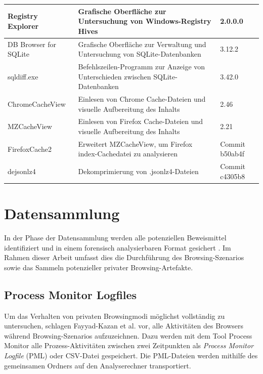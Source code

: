 \begin{table}[h!]
{\begin{tabular}{|l|l|l|}
Registry Explorer                       & Grafische Oberfläche zur Untersuchung von Windows-Registry Hives                & 2.0.0.0                               \\ \hline
DB Browser for SQLite                   & Grafische Oberfläche zur Verwaltung und Untersuchung von SQLite-Datenbanken      & 3.12.2                                \\ \hline
sqldiff.exe                             & Befehlszeilen-Programm zur Anzeige von Unterschieden zwischen SQLite-Datenbanken & 3.42.0                                \\ \hline
ChromeCacheView                         & Einlesen von Chrome Cache-Dateien und visuelle Aufbereitung des Inhalts          & 2.46                                  \\ \hline
MZCacheView                             & Einlesen von Firefox Cache-Dateien und visuelle Aufbereitung des Inhalts         & 2.21                                  \\ \hline
FirefoxCache2                           & Erweitert MZCacheView, um Firefox \glqq{}index\grqq{}-Cachedatei zu analysieren              & Commit b50ab4f                        \\ \hline
dejsonlz4                               & Dekomprimierung von .jsonlz4-Dateien                                             & Commit c4305b8                        \\ \hline
\end{tabular}
}
\end{table}


\section{Datensammlung}
\label{section:methodik-datensammlung}
In der Phase der Datensammlung werden alle potenziellen Beweismittel identifiziert und in einem forensisch analysierbaren Format gesichert \cite{Izzati.2022}.
Im Rahmen dieser Arbeit umfasst dies die Durchführung des Browsing-Szenarios sowie das Sammeln potenzieller privater Browsing-Artefakte.

\subsection*{Process Monitor Logfiles}
\label{subsection:methodik-datensammlung-processmonitorlogfiles}
Um das Verhalten von privaten Browsingmodi möglichst vollständig zu untersuchen, schlagen Fayyad-Kazan et al. \cite{Fayyad.2021} vor, alle Aktivitäten des Browsers während Browsing-Szenarios aufzuzeichnen.
Dazu werden mit dem Tool Process Monitor alle Prozess-Aktivitäten zwischen zwei Zeitpunkten als \textit{Process Monitor Logfile} (PML) oder CSV-Datei gespeichert. \cite{Fayyad.2021, Rochmadi.2017}
Die PML-Dateien werden mithilfe des gemeinsamen Ordners auf den Analyserechner transportiert.

